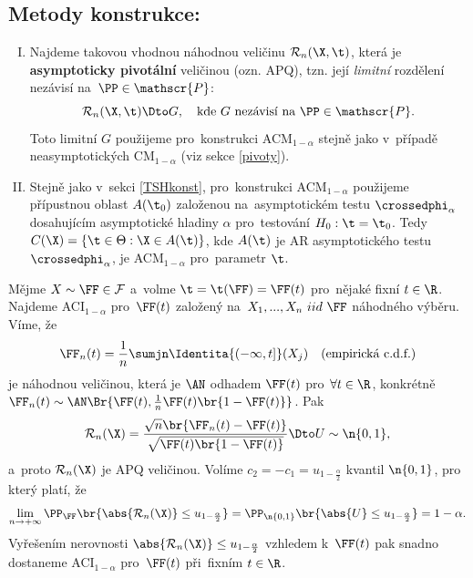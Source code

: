 \subsection*{Metody konstrukce:}
\begin{enumerate}[I)]
	\item Najdeme takovou vhodnou náhodnou veličinu $\mathcal{R}_n(\X,\t)$, která je \textbf{asymptoticky pivotální} veličinou (ozn. APQ), tzn. její \textit{limitní} rozdělení nezávisí na~$\PP\in\mathscr{P}$: 
	$$\mathcal{R}_n(\X,\t)\Dto G,\quad\text{kde }G\text{ nezávisí na~}\PP\in\mathscr{P}.$$ 
	Toto limitní $G$ použijeme pro~konstrukci ACM$_{1-\alpha}$ stejně jako v~případě neasymptotických CM$_{1-\alpha}$ (viz sekce \ref{pivoty}).
	\item Stejně jako v~sekci \ref{TSHkonst}, pro~konstrukci ACM$_{1-\alpha}$ použijeme přípustnou oblast $A(\t_0)$ založenou na~asymptotickém testu $\crossedphi_\alpha$ dosahujícím asymptotické hladiny $\alpha$ pro~testování $H_0:\t=\t_0$. Tedy $C(\X)=\left\{ \t\in\Theta:\X\in A(\t)\right\}$, kde $A(\t)$ je AR asymptotického testu $\crossedphi_\alpha$, je ACM$_{1-\alpha}$ pro~parametr $\t$.  
\end{enumerate}
\begin{example}[I]
	Mějme $X\sim\FF\in\mathcal{F}$ a~volme $\t=\t(\FF)=\FF(t)$ pro~nějaké fixní $t\in\R$. Najdeme ACI$_{1-\alpha}$ pro~$\FF(t)$ založený na~$X_1,...,X_n~iid~\FF$ náhodného výběru. Víme, že $$\FF_n(t)=\frac{1}{n}\sumjn \Identita{(-\infty,t]}(X_j)\quad\text{(empirická c.d.f.)}$$ je náhodnou veličinou, která je $\AN$ odhadem $\FF(t)$ pro~$\forall t\in\R$, konkrétně\\ $\FF_n(t)\sim\AN\Br{\FF(t),\frac{1}{n}\FF(t)\br{1-\FF(t)}}$. Pak 
	$$ \mathcal{R}_n(\X)=\frac{\sqrt{n}\br{\FF_n(t)-\FF(t)}}{\sqrt{\FF(t)\br{1-\FF(t)}}}\Dto U\sim\n{0,1}, $$ a~proto $\mathcal{R}_n(\X)$ je APQ veličinou. Volíme $c_2=-c_1=u_{1-\frac{\alpha}{2}}$ kvantil $\n{0,1}$, pro který platí, že
	$$ \lim\limits_{n\to+\infty}\PP_\FF\br{\abs{\mathcal{R}_n(\X)}\leq u_{1-\frac{\alpha}{2}}}= \PP_{\n{0,1}}\br{\abs{U}\leq u_{1-\frac{\alpha}{2}}}=1-\alpha. $$
			Vyřešením nerovnosti $\abs{\mathcal{R}_n(\X)}\leq u_{1-\frac{\alpha}{2}}$ vzhledem k~$\FF(t)$ pak snadno dostaneme ACI$_{1-\alpha}$ pro~$\FF(t)$ při~fixním $t\in\R$.
\end{example}
